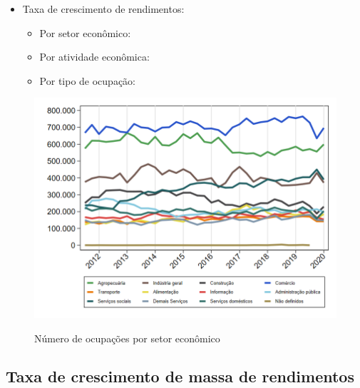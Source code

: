 \documentclass[8pt]{beamer}
\begin{document}
\begin{frame}[label=indice_principal_amz_pa]{}
\begin{itemize}
\item{Taxa de crescimento de rendimentos:
	\begin{itemize}
	\item{Por setor econômico: \hyperlink{amzparkngtxrendaporsetor}{}}
	\item{Por atividade econômica: \hyperlink{amzparkngtxrendaporatividade}{}}
	\item{Por tipo de ocupação: \hyperlink{amzparkngtxrendaporocupacao}{}}
	\end{itemize}
}
\vspace{1mm}

\end{itemize}

\end{frame}

\begin{frame}
\textit{\hyperlink{indice_principal_amz_pa}{}}
\begin{figure}
  \centering
  \includegraphics[width=.85\linewidth]{./../analysis/output/_amz_pa_importancia_relativa.png}
  \label{_amz_pa_importancia_relativa}
  \caption{{Número de ocupações por setor econômico}}
\end{figure}
\end{frame}

\subsection{Taxa de crescimento de massa de rendimentos}

\begin{frame}
\textit{\hyperlink{indice_principal_amz_pa}{}}

\end{frame}
\end{document}
